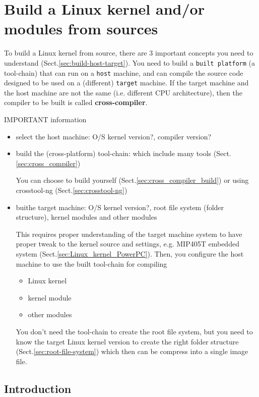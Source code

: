 \chapter{Build a Linux kernel and/or modules from sources}
\label{chap:build-Linux-kernel}

To build a Linux kernel from source, there are 3 important concepts you need to
understand (Sect.\ref{sec:build-host-target}).
You need to build a \verb!built platform! (a tool-chain) that can run on a
\verb!host! machine, and can compile the source code designed to be used on a
(different) \verb!target! machine. If the target machine and the host machine
are not the same (i.e.
different CPU architecture), then the compiler to be built is called {\bf
cross-compiler}.

IMPORTANT information
\begin{itemize}
  \item select the host machine: O/S kernel version?, compiler version?
  
  
  \item build the (cross-platform) tool-chain: which include many tools
  (Sect.\ref{sec:cross_compiler})
  
  You can choose to build yourself (Sect.\ref{sec:cross_compiler_build}) or
  using crosstool-ng (Sect.\ref{sec:crosstool-ng})
  
  \item buithe target machine: O/S kernel version?, root file system (folder
  structure), kernel modules and other modules
  
  This requires proper understanding of the target machine system to have
  proper tweak to the kernel source and settings, e.g.
  MIP405T embedded system (Sect.\ref{sec:Linux_kernel_PowerPC}).
  Then, you configure the host machine to use the built tool-chain for compiling
  \begin{itemize}
    \item Linux kernel
    \item kernel module
    \item other modules
  \end{itemize}
  
  You don't need the tool-chain to create the root file system, but you need to
  know the target Linux kernel version to create the right folder structure
  (Sect.\ref{sec:root-file-system}) which then can be compress into a single
  image file.
\end{itemize}

\section{Introduction}


